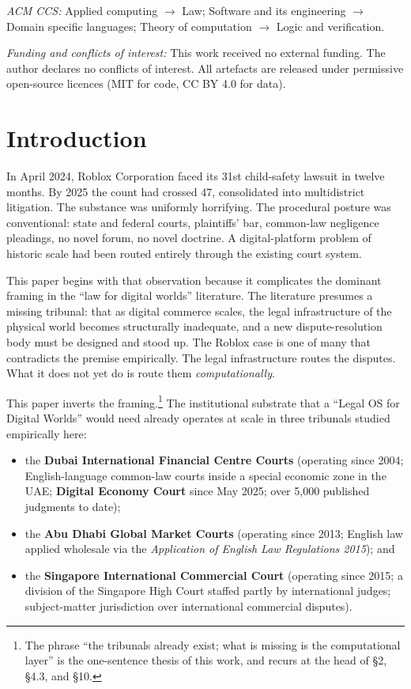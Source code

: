 \documentclass[11pt,letterpaper]{article}
\begin{document}
\smallskip
\noindent\small\textit{ACM CCS:} Applied computing $\to$ Law; Software and its engineering $\to$ Domain specific languages; Theory of computation $\to$ Logic and verification.

\smallskip
\noindent\small\textit{Funding and conflicts of interest:} This work received no external funding. The author declares no conflicts of interest. All artefacts are released under permissive open-source licences (MIT for code, CC BY 4.0 for data).

\section{Introduction}

In April 2024, Roblox Corporation faced its 31st child-safety lawsuit in twelve months. By 2025 the count had crossed 47, consolidated into multidistrict litigation. The substance was uniformly horrifying. The procedural posture was conventional: state and federal courts, plaintiffs' bar, common-law negligence pleadings, no novel forum, no novel doctrine. A digital-platform problem of historic scale had been routed entirely through the existing court system.

This paper begins with that observation because it complicates the dominant framing in the ``law for digital worlds'' literature. The literature presumes a missing tribunal: that as digital commerce scales, the legal infrastructure of the physical world becomes structurally inadequate, and a new dispute-resolution body must be designed and stood up. The Roblox case is one of many that contradicts the premise empirically. The legal infrastructure routes the disputes. What it does not yet do is route them \textit{computationally}.

This paper inverts the framing.\footnote{The phrase ``the tribunals already exist; what is missing is the computational layer'' is the one-sentence thesis of this work, and recurs at the head of \S 2, \S 4.3, and \S 10.} The institutional substrate that a ``Legal OS for Digital Worlds'' would need already operates at scale in three tribunals studied empirically here:

\begin{itemize}
  \item the \textbf{Dubai International Financial Centre Courts} (operating since 2004; English-language common-law courts inside a special economic zone in the UAE; \textbf{Digital Economy Court} since May 2025; over 5,000 published judgments to date);
  \item the \textbf{Abu Dhabi Global Market Courts} (operating since 2013; English law applied wholesale via the \emph{Application of English Law Regulations 2015}); and
  \item the \textbf{Singapore International Commercial Court} (operating since 2015; a division of the Singapore High Court staffed partly by international judges; subject-matter jurisdiction over international commercial disputes).
\end{itemize}
\end{document}
